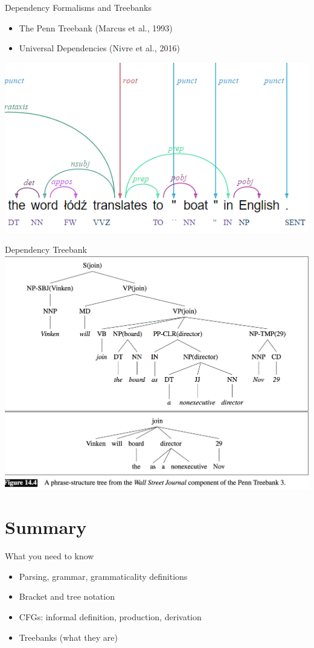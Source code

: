 \documentclass{beamer}
\begin{document}
\begin{frame}{Dependency Formalisms and Treebanks}
  \begin{itemize}
  \item The Penn Treebank (Marcus et al., 1993)
  \item Universal Dependencies (Nivre et al., 2016)
  \end{itemize}
  \includegraphics[height=0.6\textheight]{figures/ud}
\end{frame}

\begin{frame}{Dependency Treebank}
  \includegraphics[width=\textwidth]{figures/dep2}
\end{frame}

\section{Summary}

\begin{frame}{What you need to know}
  \begin{itemize}
  \item Parsing, grammar, grammaticality definitions
  \item Bracket and tree notation
  \item CFGs: informal definition, production, derivation
  \item Treebanks (what they are)
  \end{itemize}
\end{frame}
\end{document}

